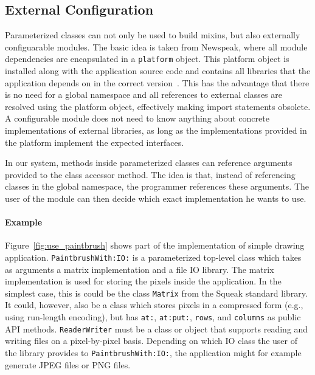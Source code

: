 \subsection{External Configuration}
Parameterized classes can not only be used to build mixins, but also externally configuarable modules. The basic idea is taken from Newspeak, where all module dependencies are encapsulated in a \texttt{platform} object. This platform object is installed along with the application source code and contains all libraries that the application depends on in the correct version~\cite{bracha2008newspeak}. This has the advantage that there is no need for a global namespace and all references to external classes are resolved using the platform object, effectively making import statements obsolete. A configurable module does not need to know anything about concrete implementations of external libraries, as long as the implementations provided in the platform implement the expected interfaces.

In our system, methods inside parameterized classes can reference arguments provided to the class accessor method. The idea is that, instead of referencing classes in the global namespace, the programmer references these arguments. The user of the module can then decide which exact implementation he wants to use.

\paragraph{Example}
Figure~\ref{fig:use_paintbrush} shows part of the implementation of simple drawing application. \texttt{PaintbrushWith:IO:} is a parameterized top-level class which takes as arguments a matrix implementation and a file IO library. The matrix implementation is used for storing the pixels inside the application. In the simplest case, this is could be the class \texttt{Matrix} from the Squeak standard library. It could, however, also be a class which stores pixels in a compressed form (e.g., using run-length encoding), but has \texttt{at:}, \texttt{at:put:}, \texttt{rows}, and \texttt{columns} as public API methods. \texttt{ReaderWriter} must be a class or object that supports reading and writing files on a pixel-by-pixel basis. Depending on which IO class the user of the library provides to \texttt{PaintbrushWith:IO:}, the application might for example generate JPEG files or PNG files.

